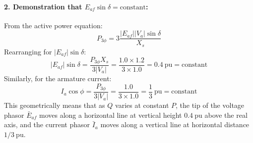 \paragraph{2. Demonstration that $E_{af}\sin\delta = \text{constant}$:}
From the active power equation:
\begin{equation}
    P_{3\phi} = 3 \frac{|E_{af}| |V_a| \sin\delta}{X_s}
\end{equation}
Rearranging for $|E_{af}| \sin\delta$:
\begin{equation}
    \boxed{|E_{af}| \sin\delta = \frac{P_{3\phi} X_s}{3 |V_a|} = \frac{1.0 \times 1.2}{3 \times 1.0} = 0.4\ \text{pu} = \text{constant}}
\end{equation}
Similarly, for the armature current:
\begin{equation}
    I_a \cos\phi = \frac{P_{3\phi}}{3 |V_a|} = \frac{1.0}{3 \times 1.0} = \frac{1}{3}\ \text{pu} = \text{constant}
\end{equation}
This geometrically means that as $Q$ varies at constant $P$, the tip of the voltage phasor $\bar{E}_{af}$ moves along a horizontal line at vertical height $0.4\ \text{pu}$ above the real axis, and the current phasor $\bar{I}_a$ moves along a vertical line at horizontal distance $1/3\ \text{pu}$.

